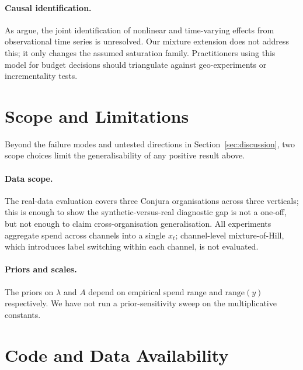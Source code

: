 \documentclass[11pt]{article}
\begin{document}
\paragraph{Causal identification.} As \citet{dew2024mmm} argue, the joint identification of nonlinear and time-varying effects from observational time series is unresolved. Our mixture extension does not address this; it only changes the assumed saturation family. Practitioners using this model for budget decisions should triangulate against geo-experiments or incrementality tests.

\section{Scope and Limitations}
\label{sec:limitations}

Beyond the failure modes and untested directions in Section~\ref{sec:discussion}, two scope choices limit the generalisability of any positive result above.

\paragraph{Data scope.} The real-data evaluation covers three Conjura organisations across three verticals; this is enough to show the synthetic-versus-real diagnostic gap is not a one-off, but not enough to claim cross-organisation generalisation. All experiments aggregate spend across channels into a single $x_t$; channel-level mixture-of-Hill, which introduces label switching within each channel, is not evaluated.

\paragraph{Priors and scales.} The priors on $\lambda$ and $A$ depend on empirical spend range and $\text{range}(y)$ respectively. We have not run a prior-sensitivity sweep on the multiplicative constants.

\section{Code and Data Availability}
\label{sec:repro}
\end{document}
